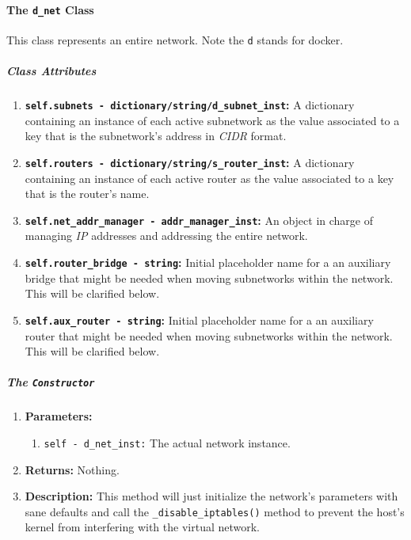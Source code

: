     \paragraph{The \texttt{d\_net} Class}
        This class represents an entire network. Note the \texttt{d} stands for docker.

        \subparagraph{Class Attributes}
            \begin{enumerate}
                \item \textbf{\texttt{self.subnets - dictionary/string/d\_subnet\_inst}:} A dictionary containing an instance of each active subnetwork as the value associated to a key that is the subnetwork's address in \textit{CIDR} format.
                \item \textbf{\texttt{self.routers - dictionary/string/s\_router\_inst}:} A dictionary containing an instance of each active router as the value associated to a key that is the router's name.
                \item \textbf{\texttt{self.net\_addr\_manager - addr\_manager\_inst}:} An object in charge of managing \textit{IP} addresses and addressing the entire network.
                \item \textbf{\texttt{self.router\_bridge - string}:} Initial placeholder name for a an auxiliary bridge that might be needed when moving subnetworks within the network. This will be clarified below.
                \item \textbf{\texttt{self.aux\_router - string}:} Initial placeholder name for a an auxiliary router that might be needed when moving subnetworks within the network. This will be clarified below.
            \end{enumerate}

        \subparagraph{The \texttt{Constructor}}
            \begin{enumerate}
                \item \textbf{Parameters:}
                \begin{enumerate}
                    \item \texttt{self - d\_net\_inst:} The actual network instance.
                \end{enumerate}
                \item \textbf{Returns:} Nothing.
                \item \textbf{Description:} This method will just initialize the network's parameters with sane defaults and call the \texttt{\_disable\_iptables()} method to prevent the host's kernel from interfering with the virtual network.
            \end{enumerate}

